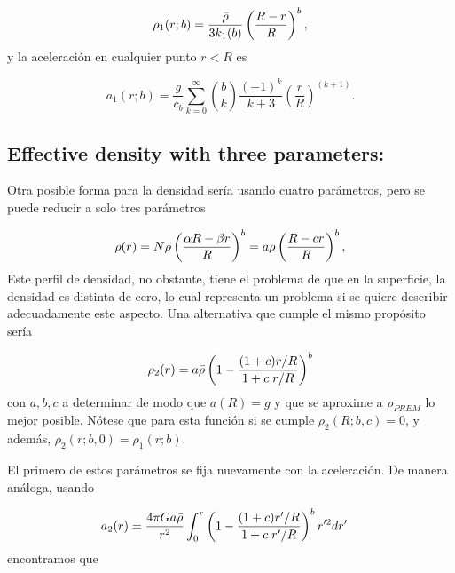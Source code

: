 \documentclass[aps,twocolumn,showpacs,preprintnumbers]{revtex4}
\begin{document}
    \begin{equation}
        \rho_1 (r;b) = \frac{\Bar{\rho}}{ 3 k_1(b)}  \left( \frac{R-r}{R}\right)^b,
        \label{densidad efectiva 1}
    \end{equation}
    y la aceleración en cualquier punto $r<R$ es
    
    \begin{equation}
        a_1 (r;b) = \frac{g}{c_b} \sum_{k=0}^{\infty}  \binom{b}{k} \frac{(-1)^k}{k+3} \left(\frac{r}{R} \right)^{(k+1)}.
        \label{aceleración gravitacional general}
    \end{equation}
 
    
    
    \subsection{Effective density with three parameters:}
    
    Otra posible forma para la densidad sería usando cuatro parámetros, pero se puede reducir a solo tres parámetros
    
    \begin{equation*}
        \rho(r) = N \Bar{\rho} \left( \frac{\alpha R - \beta r}{R}\right)^b = a \Bar{\rho} \left( \frac{ R - c r}{R} \right)^b,
    \end{equation*}
    Este perfil de densidad, no obstante, tiene el problema de que en la superficie, la densidad es distinta de cero, lo cual representa un problema si se quiere describir adecuadamente este aspecto. Una alternativa que cumple el mismo propósito sería 
    
    \begin{equation}
        \rho_2(r) = a \Bar{\rho} \left(  1 - \frac{(1+c) r/R}{1+c \; r/R} \right)^b
        \label{densidad general 2}
    \end{equation}
    con $a,b,c$ a determinar de modo que $a(R)=g$ y que se aproxime a $\rho_{PREM}$ lo mejor posible. Nótese que para esta función si se cumple $\rho_2(R; b, c) = 0$, y además, $\rho_2(r;b,0) = \rho_1 (r;b)$.
    
    El primero de estos parámetros se fija nuevamente con la aceleración. De manera análoga, usando 
    
    
     \begin{align}
          a_2 (r) &= \frac{4 \pi G a  \Bar{\rho} }{r^2} \int_0^r  \left(  1 - \frac{(1+c) r'/R}{1+c \; r'/R} \right)^b r'^2 dr'
          \label{aceleración gravitacional general 2}
    \end{align}
    encontramos que
    
\end{document}
